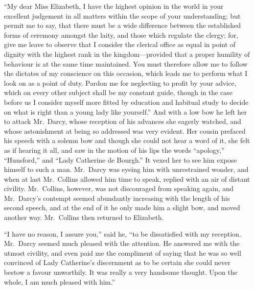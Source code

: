 \documentclass[12pt,english]{book}
\begin{document}
{}``My dear Miss Elizabeth, I have the highest opinion in the world
in your excellent judgement in all matters within the scope of your
understanding; but permit me to say, that there must be a wide difference
between the established forms of ceremony amongst the laity, and those
which regulate the clergy; for, give me leave to observe that I consider
the clerical office as equal in point of dignity with the highest
rank in the kingdom\mbox{---}provided that a proper humility of behaviour
is at the same time maintained. You must therefore allow me to follow
the dictates of my conscience on this occasion, which leads me to
perform what I look on as a point of duty. Pardon me for neglecting
to profit by your advice, which on every other subject shall be my
constant guide, though in the case before us I consider myself more
fitted by education and habitual study to decide on what is right
than a young lady like yourself.'' And with a low bow he left her
to attack Mr.\ Darcy, whose reception of his advances she eagerly
watched, and whose astonishment at being so addressed was very evident.
Her cousin prefaced his speech with a solemn bow and though she could
not hear a word of it, she felt as if hearing it all, and saw in the
motion of his lips the words {}``apology,'' {}``Hunsford,'' and
{}``Lady Catherine de Bourgh.'' It vexed her to see him expose himself
to such a man. Mr.\ Darcy was eyeing him with unrestrained wonder,
and when at last Mr.\ Collins allowed him time to speak, replied
with an air of distant civility. Mr.\ Collins, however, was not discouraged
from speaking again, and Mr.\ Darcy's contempt seemed abundantly
increasing with the length of his second speech, and at the end of
it he only made him a slight bow, and moved another way. Mr.\ Collins
then returned to Elizabeth.

{}``I have no reason, I assure you,'' said he, {}``to be dissatisfied
with my reception. Mr.\ Darcy seemed much pleased with the attention.
He answered me with the utmost civility, and even paid me the compliment
of saying that he was so well convinced of Lady Catherine's discernment
as to be certain she could never bestow a favour unworthily. It was
really a very handsome thought. Upon the whole, I am much pleased
with him.''
\end{document}
